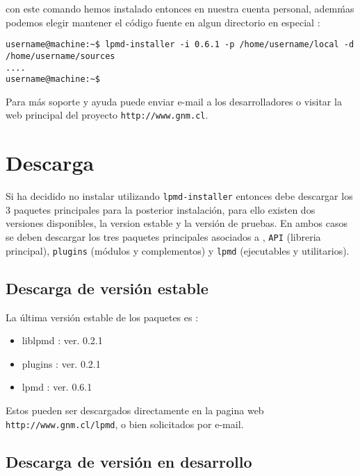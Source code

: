 con este comando hemos instalado entonces {\lpmd} en nuestra cuenta personal, adem\'mas podemos elegir mantener el c\'odigo fuente en algun directorio en especial :

\begin{verbatim}
username@machine:~$ lpmd-installer -i 0.6.1 -p /home/username/local -d /home/username/sources
....
username@machine:~$
\end{verbatim}

Para m\'as soporte y ayuda puede enviar e-mail a los desarrolladores o visitar la web principal del proyecto \verb|http://www.gnm.cl|.

\section{Descarga}

Si ha decidido no instalar {\lpmd} utilizando \verb|lpmd-installer| entonces debe descargar los 3 paquetes principales para la posterior instalaci\'on, para ello existen dos versiones disponibles, la version estable y la versi\'on de pruebas. En ambos casos se deben descargar los tres paquetes principales asociados a {\lpmd}, \verb|API| (libreria principal), \verb|plugins| (m\'odulos y complementos) y \verb|lpmd| (ejecutables y utilitarios).

\subsection{Descarga de versi\'on estable}

La \'ultima versi\'on estable de los paquetes es :

\begin{itemize}
 \item liblpmd : ver. 0.2.1
 \item plugins : ver. 0.2.1
 \item lpmd    : ver. 0.6.1
\end{itemize}

Estos pueden ser descargados directamente en la pagina web \texttt{http://www.gnm.cl/lpmd}, o bien solicitados por e-mail.

\subsection{Descarga de versi\'on en desarrollo}

